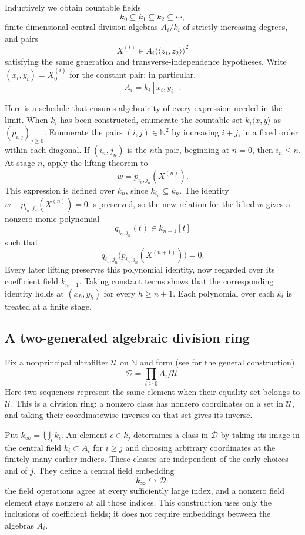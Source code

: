 \documentclass[11pt]{article}
\theoremstyle{definition}
\theoremstyle{remark}
\numberwithin{equation}{section}
\begin{document}
Inductively we obtain countable fields
\[
 k_0\subseteq k_1\subseteq k_2\subseteq\cdots,
\]
finite-dimensional central division algebras $A_i/k_i$ of strictly
increasing degrees, and pairs
\[
 X^{(i)}\in A_i\langle\!\langle z_1,z_2\rangle\!\rangle^2
\]
satisfying the same generation and transverse-independence hypotheses.
Write $(x_i,y_i)=X^{(i)}_0$ for the constant pair; in particular,
\begin{equation}
 A_i=k_i[x_i,y_i].
 \label{eq:stage-generation}
\end{equation}

Here is a schedule that ensures algebraicity of every expression
needed in the limit.  When $k_i$ has been constructed, enumerate the
countable set $k_i\langle x,y\rangle$ as
$(p_{i,j})_{j\geq0}$.  Enumerate the pairs $(i,j)\in\mathbb N^2$ by
increasing $i+j$, in a fixed order within each diagonal.  If $(i_n,j_n)$
is the $n$th pair, beginning at $n=0$, then $i_n\leq n$.
At stage $n$, apply the lifting theorem to
\[
 w=p_{i_n,j_n}(X^{(n)}).
\]
This expression is defined over $k_n$, since $k_{i_n}\subseteq k_n$.
The identity $w-p_{i_n,j_n}(X^{(n)})=0$ is preserved, so the new relation
for the lifted $w$ gives a nonzero monic polynomial
\[
 q_{i_n,j_n}(t)\in k_{n+1}[t]
\]
such that
\begin{equation}
 q_{i_n,j_n}\bigl(p_{i_n,j_n}(X^{(n+1)})\bigr)=0.
 \label{eq:retained-formal-relation}
\end{equation}
Every later lifting preserves this polynomial identity, now regarded
over its coefficient field $k_{n+1}$.  Taking constant terms shows that
the corresponding identity holds at $(x_h,y_h)$ for every $h\geq n+1$.
Each polynomial over each $k_i$ is treated at a finite stage.

\subsection{A two-generated algebraic division ring}

Fix a nonprincipal ultrafilter $\mathcal U$ on $\mathbb N$ and form
(see \cite{Keisler2010} for the general construction)
\[
 \mathcal D=\prod_{i\geq0} A_i\big/\mathcal U.
\]
Here two sequences represent the same element when their equality set
belongs to $\mathcal U$.  This is a division ring: a nonzero class has
nonzero coordinates on a set in $\mathcal U$, and taking their
coordinatewise inverses on that set gives its inverse.

Put $k_\infty=\bigcup_i k_i$.  An element $c\in k_j$ determines a class
in $\mathcal D$ by taking its image in the central field $k_i\subset A_i$
for $i\geq j$ and choosing arbitrary coordinates at the finitely many
earlier indices.  These classes are independent of the early choices
and of $j$.  They define a central field embedding
\[
 k_\infty\hookrightarrow\mathcal D:
\]
the field operations agree at every sufficiently large index, and a
nonzero field element stays nonzero at all those indices.  This
construction uses only the inclusions of coefficient fields; it does
not require embeddings between the algebras $A_i$.
\end{document}
